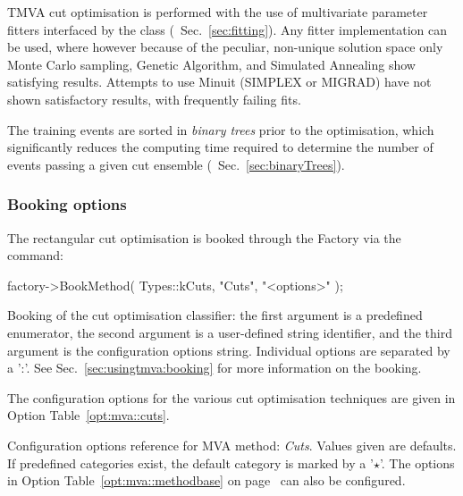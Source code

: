 TMVA cut optimisation is performed with the use of multivariate parameter fitters 
interfaced by the class  (\cf\  Sec.~\ref{sec:fitting}). Any 
fitter implementation can be used, where however because of the peculiar, non-unique 
solution space only Monte Carlo sampling, Genetic Algorithm, and Simulated Annealing 
show satisfying results. Attempts to use Minuit (SIMPLEX or MIGRAD) have not shown 
satisfactory results, with frequently failing fits.

The training events are sorted in {\em binary trees} 
prior to the optimisation, which significantly reduces the computing time required 
to determine the number of events passing a given cut ensemble (\cf\  
Sec.~\ref{sec:binaryTrees}).

\subsubsection{Booking options}

The rectangular cut optimisation is booked through the Factory via the command:
\begin{codeexample}
\begin{tmvacode}
factory->BookMethod( Types::kCuts, "Cuts", "<options>" );
\end{tmvacode}
\caption[.]{\codeexampleCaptionSize Booking of the cut optimisation classifier: the 
         first argument is a predefined enumerator, the second argument is a 
         user-defined string identifier, and the third argument is the configuration 
         options string. Individual options are separated by a ':'. 
         See Sec.~\ref{sec:usingtmva:booking} for more information on the booking.}
\end{codeexample}

The configuration options for the various cut optimisation techniques 
are given in Option Table~\ref{opt:mva::cuts}.

\begin{option}[t]

\caption[.]{\optionCaptionSize 
     Configuration options reference for MVA method: {\em Cuts}.
     Values given are defaults. If predefined categories exist, the default category is marked by a '$\star$'. 
     The options in Option Table~\ref{opt:mva::methodbase} on page~\pageref{opt:mva::methodbase} can also be configured.     
}
\label{opt:mva::cuts}
\end{option}

